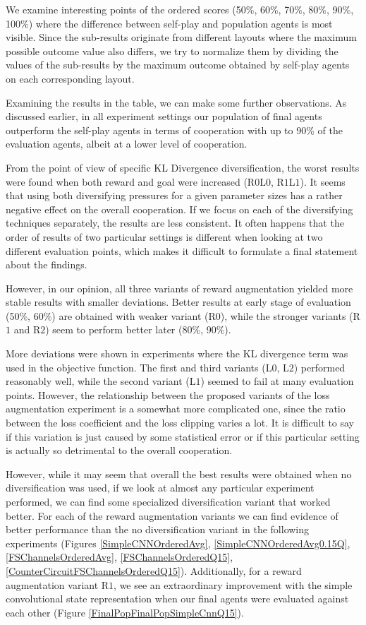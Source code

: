 We examine interesting points of the ordered scores (50\%, 60\%, 70\%, 80\%, 90\%, 100\%) where the difference between self-play and population agents is most visible.
Since the sub-results originate from different layouts where the maximum possible outcome value also differs, we try to normalize them by dividing the values of the sub-results by the maximum outcome obtained by self-play agents on each corresponding layout.

Examining the results in the table, we can make some further observations.
As discussed earlier, in all experiment settings our population of final agents outperform the self-play agents in terms of cooperation with up to 90\% of the evaluation agents, albeit at a lower level of cooperation.

From the point of view of specific KL Divergence diversification, the worst results were found when both reward and goal were increased (R$0$L$0$, R$1$L$1$).
It seems that using both diversifying pressures for a given parameter sizes has a rather negative effect on the overall cooperation.
If we focus on each of the diversifying techniques separately, the results are less consistent.
It often happens that the order of results of two particular settings is different when looking at two different evaluation points, which makes it difficult to formulate a final statement about the findings.

However, in our opinion, all three variants of reward augmentation yielded more stable results with smaller deviations.
Better results at early stage of evaluation (50\%, 60\%) are obtained with weaker variant (R$0$), while the stronger variants (R$1$ and R$2$) seem to perform better later (80\%, 90\%).


More deviations were shown in experiments where the KL divergence term was used in the objective function.
The first and third variants (L$0$, L$2$) performed reasonably well, while the second variant (L$1$) seemed to fail at many evaluation points.
However, the relationship between the proposed variants of the loss augmentation experiment is a somewhat more complicated one, since the ratio between the loss coefficient and the loss clipping varies a lot. 
It is difficult to say if this variation is just caused by some statistical error or if this particular setting is actually so detrimental to the overall cooperation.

However, while it may seem that overall the best results were obtained when no diversification was used, if we look at almost any particular experiment performed, we can find some specialized diversification variant that worked better.
For each of the reward augmentation variants we can find evidence of better performance than the no diversification variant in the following experiments (Figures \ref{SimpleCNNOrderedAvg}, \ref{SimpleCNNOrderedAvg0.15Q}, \ref{FSChannelsOrderedAvg}, \ref{FSChannelsOrderedQ15}, \ref{CounterCircuitFSChannelsOrderedQ15}).
Additionally, for a reward augmentation variant R$1$, we see an extraordinary improvement with the simple convolutional state representation when our final agents were evaluated against each other (Figure \ref{FinalPopFinalPopSimpleCnnQ15}). 

